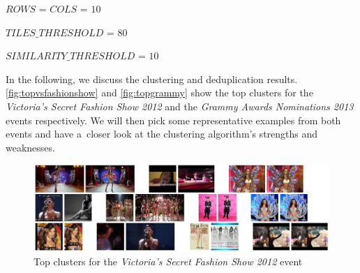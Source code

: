 \begin{small_itemize}
  \item[] $ROWS$ = $COLS$ = $10$
  \item[] $TILES\_THRESHOLD$ = $80$
  \item[] $SIMILARITY\_THRESHOLD$ = $10$
\end{small_itemize}

In the following, we discuss the clustering and deduplication results.
\autoref{fig:topvsfashionshow} and \autoref{fig:topgrammy} show the top clusters
for the \emph{Victoria's Secret Fashion Show 2012} and the 
\emph{Grammy Awards Nominations 2013} events respectively.
We will then pick some representative examples from both events
and have a~closer look at the clustering algorithm's strengths and weaknesses.

\begin{figure}[h!]
  \centering
  \includegraphics[width=1.0\linewidth]{./vsfashionshow_clusters.png}
  \caption{Top clusters for the \emph{Victoria's Secret Fashion Show 2012} event}
  \label{fig:topvsfashionshow}
\end{figure}

